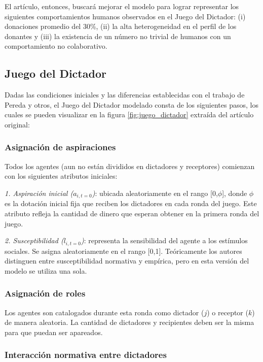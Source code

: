 \documentclass[12pt,a4paper]{article}
\begin{document}
El artículo, entonces, buscará mejorar el modelo para lograr representar los siguientes comportamientos 
humanos observados en el Juego del Dictador: (i) donaciones promedio del 30\%, (ii) la alta 
heterogeneidad en el perfil de los donantes y (iii) la existencia de un número no trivial de humanos 
con un comportamiento no colaborativo.

\subsection{Juego del Dictador}

Dadas las condiciones iniciales y las diferencias establecidas con el trabajo de Pereda y 
otros, el Juego del Dictador modelado consta de los siguientes pasos, los cuales se pueden
visualizar en la figura \ref{fig:juego_dictador} extraída del artículo original:

\subsubsection{Asignación de aspiraciones}

Todos los agentes (aun no están divididos en dictadores y receptores) comienzan con los siguientes
atributos iniciales:

\textit{1. Aspiración inicial ($a_{i,t=0}$)}: ubicada aleatoriamente en el rango [0,$\phi$], donde $\phi$ es 
la dotación inicial fija que reciben los dictadores en cada ronda del juego. Este atributo refleja
la cantidad de dinero que esperan obtener en la primera ronda del juego.

\textit{2. Susceptibilidad ($l_{i,t=0}$)}: representa la sensibilidad del agente a los estímulos sociales. Se 
asigna aleatoriamente en el rango [0,1]. Teóricamente los autores distinguen entre susceptibilidad
normativa y empírica, pero en esta versión del modelo se utiliza una sola.

\subsubsection{Asignación de roles}

Los agentes son catalogados durante esta ronda como dictador ($j$) o receptor ($k$) de manera aleatoria. La
cantidad de dictadores y recipientes deben ser la misma para que puedan ser apareados.

\subsubsection{Interacción normativa entre dictadores}
\end{document}
